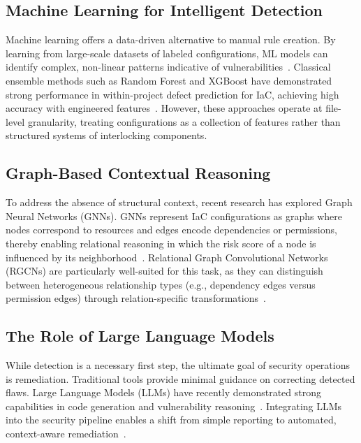 \documentclass[conference]{IEEEtran}
\begin{document}
\subsection{Machine Learning for Intelligent Detection}

Machine learning offers a data-driven alternative to manual rule creation. By learning from large-scale datasets of labeled configurations, ML models can identify complex, non-linear patterns indicative of vulnerabilities~\cite{dallapalma2020, shivakumar2023}. Classical ensemble methods such as Random Forest and XGBoost have demonstrated strong performance in within-project defect prediction for IaC, achieving high accuracy with engineered features~\cite{dallapalma2020}. However, these approaches operate at file-level granularity, treating configurations as a collection of features rather than structured systems of interlocking components.

\subsection{Graph-Based Contextual Reasoning}

To address the absence of structural context, recent research has explored Graph Neural Networks (GNNs). GNNs represent IaC configurations as graphs where nodes correspond to resources and edges encode dependencies or permissions, thereby enabling relational reasoning in which the risk score of a node is influenced by its neighborhood~\cite{jakkaraju2024, cloudy2023}. Relational Graph Convolutional Networks (RGCNs) are particularly well-suited for this task, as they can distinguish between heterogeneous relationship types (e.g., dependency edges versus permission edges) through relation-specific transformations~\cite{schlichtkrull2018}.

\subsection{The Role of Large Language Models}

While detection is a necessary first step, the ultimate goal of security operations is remediation. Traditional tools provide minimal guidance on correcting detected flaws. Large Language Models (LLMs) have recently demonstrated strong capabilities in code generation and vulnerability reasoning~\cite{genkubesec2024, palavalli2024}. Integrating LLMs into the security pipeline enables a shift from simple reporting to automated, context-aware remediation~\cite{minna2024, khan2024}.
\end{document}
